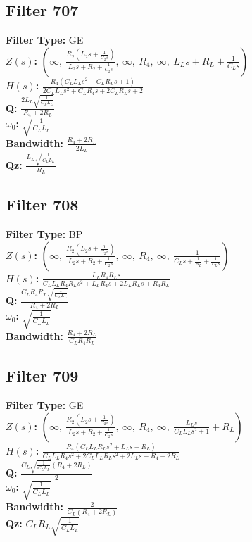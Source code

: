 \documentclass{article}
\begin{document}
\subsection*{Filter 707}
\textbf{Filter Type:} GE \\ 
\textbf{$Z(s)$:} $\left( \infty, \  \frac{R_{2} \left(L_{2} s + \frac{1}{C_{2} s}\right)}{L_{2} s + R_{2} + \frac{1}{C_{2} s}}, \  \infty, \  R_{4}, \  \infty, \  L_{L} s + R_{L} + \frac{1}{C_{L} s}\right)$ \\ 
\textbf{$H(s)$:} $\frac{R_{4} \left(C_{L} L_{L} s^{2} + C_{L} R_{L} s + 1\right)}{2 C_{L} L_{L} s^{2} + C_{L} R_{4} s + 2 C_{L} R_{L} s + 2}$ \\ 
\textbf{Q:} $\frac{2 L_{L} \sqrt{\frac{1}{C_{L} L_{L}}}}{R_{4} + 2 R_{L}}$ \\ 
\textbf{$\omega_0$:} $\sqrt{\frac{1}{C_{L} L_{L}}}$ \\ 
\textbf{Bandwidth:} $\frac{R_{4} + 2 R_{L}}{2 L_{L}}$ \\ 
\textbf{Qz:} $\frac{L_{L} \sqrt{\frac{1}{C_{L} L_{L}}}}{R_{L}}$ \\ 
\subsection*{Filter 708}
\textbf{Filter Type:} BP \\ 
\textbf{$Z(s)$:} $\left( \infty, \  \frac{R_{2} \left(L_{2} s + \frac{1}{C_{2} s}\right)}{L_{2} s + R_{2} + \frac{1}{C_{2} s}}, \  \infty, \  R_{4}, \  \infty, \  \frac{1}{C_{L} s + \frac{1}{R_{L}} + \frac{1}{L_{L} s}}\right)$ \\ 
\textbf{$H(s)$:} $\frac{L_{L} R_{4} R_{L} s}{C_{L} L_{L} R_{4} R_{L} s^{2} + L_{L} R_{4} s + 2 L_{L} R_{L} s + R_{4} R_{L}}$ \\ 
\textbf{Q:} $\frac{C_{L} R_{4} R_{L} \sqrt{\frac{1}{C_{L} L_{L}}}}{R_{4} + 2 R_{L}}$ \\ 
\textbf{$\omega_0$:} $\sqrt{\frac{1}{C_{L} L_{L}}}$ \\ 
\textbf{Bandwidth:} $\frac{R_{4} + 2 R_{L}}{C_{L} R_{4} R_{L}}$ \\ 
\subsection*{Filter 709}
\textbf{Filter Type:} GE \\ 
\textbf{$Z(s)$:} $\left( \infty, \  \frac{R_{2} \left(L_{2} s + \frac{1}{C_{2} s}\right)}{L_{2} s + R_{2} + \frac{1}{C_{2} s}}, \  \infty, \  R_{4}, \  \infty, \  \frac{L_{L} s}{C_{L} L_{L} s^{2} + 1} + R_{L}\right)$ \\ 
\textbf{$H(s)$:} $\frac{R_{4} \left(C_{L} L_{L} R_{L} s^{2} + L_{L} s + R_{L}\right)}{C_{L} L_{L} R_{4} s^{2} + 2 C_{L} L_{L} R_{L} s^{2} + 2 L_{L} s + R_{4} + 2 R_{L}}$ \\ 
\textbf{Q:} $\frac{C_{L} \sqrt{\frac{1}{C_{L} L_{L}}} \left(R_{4} + 2 R_{L}\right)}{2}$ \\ 
\textbf{$\omega_0$:} $\sqrt{\frac{1}{C_{L} L_{L}}}$ \\ 
\textbf{Bandwidth:} $\frac{2}{C_{L} \left(R_{4} + 2 R_{L}\right)}$ \\ 
\textbf{Qz:} $C_{L} R_{L} \sqrt{\frac{1}{C_{L} L_{L}}}$ \\ 
\end{document}
